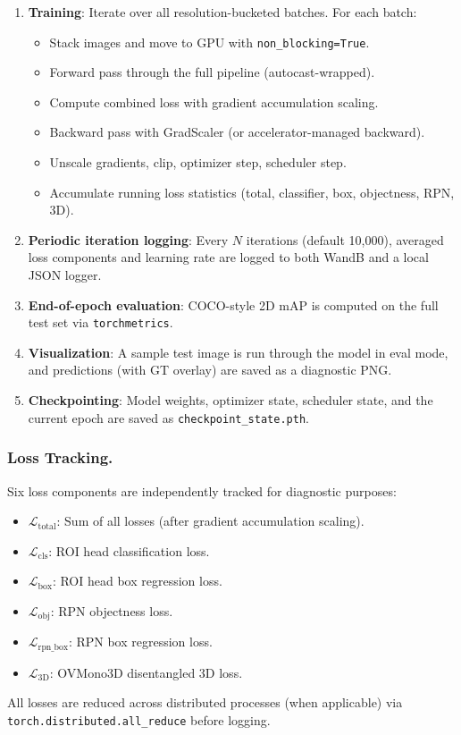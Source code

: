 \documentclass[runningheads]{llncs}
\begin{document}
\begin{enumerate}
    \item \textbf{Training}: Iterate over all resolution-bucketed batches. For each batch:
    \begin{itemize}
        \item Stack images and move to GPU with \texttt{non\_blocking=True}.
        \item Forward pass through the full pipeline (autocast-wrapped).
        \item Compute combined loss with gradient accumulation scaling.
        \item Backward pass with GradScaler (or accelerator-managed backward).
        \item Unscale gradients, clip, optimizer step, scheduler step.
        \item Accumulate running loss statistics (total, classifier, box, objectness, RPN, 3D).
    \end{itemize}
    
    \item \textbf{Periodic iteration logging}: Every $N$ iterations (default 10,000), averaged loss components and learning rate are logged to both WandB and a local JSON logger.
    
    \item \textbf{End-of-epoch evaluation}: COCO-style 2D mAP is computed on the full test set via \texttt{torchmetrics}.
    
    \item \textbf{Visualization}: A sample test image is run through the model in eval mode, and predictions (with GT overlay) are saved as a diagnostic PNG.
    
    \item \textbf{Checkpointing}: Model weights, optimizer state, scheduler state, and the current epoch are saved as \texttt{checkpoint\_state.pth}.
\end{enumerate}

\subsubsection{Loss Tracking.}
Six loss components are independently tracked for diagnostic purposes:
\begin{itemize}
    \item $\mathcal{L}_{\text{total}}$: Sum of all losses (after gradient accumulation scaling).
    \item $\mathcal{L}_{\text{cls}}$: ROI head classification loss.
    \item $\mathcal{L}_{\text{box}}$: ROI head box regression loss.
    \item $\mathcal{L}_{\text{obj}}$: RPN objectness loss.
    \item $\mathcal{L}_{\text{rpn\_box}}$: RPN box regression loss.
    \item $\mathcal{L}_{\text{3D}}$: OVMono3D disentangled 3D loss.
\end{itemize}
All losses are reduced across distributed processes (when applicable) via \texttt{torch.distributed.all\_reduce} before logging.
\end{document}
